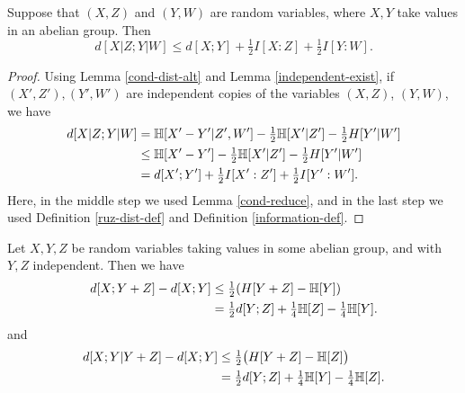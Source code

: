 \begin{lemma}\label{cond-dist-fact}
  Suppose that $(X, Z)$ and $(Y, W)$ are random variables, where $X, Y$ take values in an abelian group. Then
  \[    d[X  | Z;Y | W] \leq d[X; Y] + \tfrac{1}{2} I[X : Z] + \tfrac{1}{2} I[Y : W].\]
\end{lemma}

\begin{proof}
Using Lemma \ref{cond-dist-alt} and Lemma \ref{independent-exist}, if $(X',Z'), (Y',W')$ are independent copies of the variables $(X,Z)$, $(Y,W)$, we have
\begin{align*}
  d[X  | Z; Y | W]&= \mathbb{H}[X'-Y'|Z',W'] - \tfrac{1}{2} \mathbb{H}[X'|Z'] - \tfrac{1}{2}H[Y'|W'] \\
                       &\le \mathbb{H}[X'-Y']- \tfrac{1}{2} \mathbb{H}[X'|Z'] - \tfrac{1}{2}H[Y'|W'] \\
                       &= d[X';Y'] + \tfrac{1}{2} I[X' : Z'] + \tfrac{1}{2} I[Y' : W'].
\end{align*}
Here, in the middle step we used Lemma \ref{cond-reduce}, and in the last step we used Definition \ref{ruz-dist-def} and Definition \ref{information-def}.
\end{proof}

\begin{lemma}\label{first-useful}
  Let $X, Y, Z$ be random variables taking values in some abelian group, and with $Y, Z$ independent. Then we have
  \begin{align}\nonumber d[X; Y + Z] -d[X; Y] &  \leq \tfrac{1}{2} (H[Y+Z] - \mathbb{H}[Y]) \\ & = \tfrac{1}{2} d[Y; Z] + \tfrac{1}{4} \mathbb{H}[Z] - \tfrac{1}{4} \mathbb{H}[Y]. \label{lem51-a} \end{align}
  and
  \begin{align}\nonumber
  d[X;Y|Y+Z] - d[X;Y] & \leq \tfrac{1}{2} \bigl(H[Y+Z] - \mathbb{H}[Z]\bigr) \\ & = \tfrac{1}{2} d[Y;Z] + \tfrac{1}{4} \mathbb{H}[Y] - \tfrac{1}{4} \mathbb{H}[Z].
    \label{ruzsa-3}
  \end{align}
  \end{lemma}


